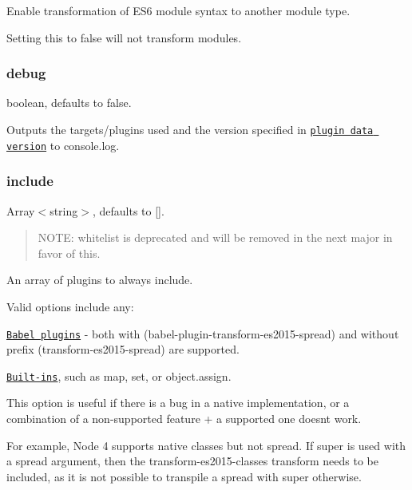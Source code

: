 Enable transformation of E\+S6 module syntax to another module type.

Setting this to {\ttfamily false} will not transform modules.

\subsubsection*{{\ttfamily debug}}

{\ttfamily boolean}, defaults to {\ttfamily false}.

Outputs the targets/plugins used and the version specified in \href{https://github.com/babel/babel-preset-env/blob/master/data/plugins.json}{\tt plugin data version} to {\ttfamily console.\+log}.

\subsubsection*{{\ttfamily include}}

{\ttfamily Array$<$string$>$}, defaults to {\ttfamily \mbox{[}\mbox{]}}.

\begin{quote}
N\+O\+TE\+: {\ttfamily whitelist} is deprecated and will be removed in the next major in favor of this. \end{quote}


An array of plugins to always include.

Valid options include any\+:


\begin{DoxyItemize}
\item \href{https://github.com/babel/babel-preset-env/blob/master/data/plugin-features.js}{\tt Babel plugins} -\/ both with ({\ttfamily babel-\/plugin-\/transform-\/es2015-\/spread}) and without prefix ({\ttfamily transform-\/es2015-\/spread}) are supported.
\item \href{https://github.com/babel/babel-preset-env/blob/master/data/built-in-features.js}{\tt Built-\/ins}, such as {\ttfamily map}, {\ttfamily set}, or {\ttfamily object.\+assign}.
\end{DoxyItemize}

This option is useful if there is a bug in a native implementation, or a combination of a non-\/supported feature + a supported one doesn\textquotesingle{}t work.

For example, Node 4 supports native classes but not spread. If {\ttfamily super} is used with a spread argument, then the {\ttfamily transform-\/es2015-\/classes} transform needs to be {\ttfamily include}d, as it is not possible to transpile a spread with {\ttfamily super} otherwise.

